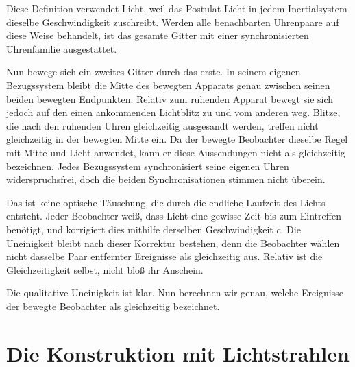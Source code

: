 Diese Definition verwendet Licht, weil das Postulat Licht in jedem Inertialsystem dieselbe Geschwindigkeit zuschreibt. Werden alle benachbarten Uhrenpaare auf diese Weise behandelt, ist das gesamte Gitter mit einer synchronisierten Uhrenfamilie ausgestattet.

Nun bewege sich ein zweites Gitter durch das erste. In seinem eigenen Bezugssystem bleibt die Mitte des bewegten Apparats genau zwischen seinen beiden bewegten Endpunkten. Relativ zum ruhenden Apparat bewegt sie sich jedoch auf den einen ankommenden Lichtblitz zu und vom anderen weg. Blitze, die nach den ruhenden Uhren gleichzeitig ausgesandt werden, treffen nicht gleichzeitig in der bewegten Mitte ein. Da der bewegte Beobachter dieselbe Regel mit Mitte und Licht anwendet, kann er diese Aussendungen nicht als gleichzeitig bezeichnen. Jedes Bezugssystem synchronisiert seine eigenen Uhren widerspruchsfrei, doch die beiden Synchronisationen stimmen nicht überein.

Das ist keine optische Täuschung, die durch die endliche Laufzeit des Lichts entsteht. Jeder Beobachter weiß, dass Licht eine gewisse Zeit bis zum Eintreffen benötigt, und korrigiert dies mithilfe derselben Geschwindigkeit \(c\). Die Uneinigkeit bleibt nach dieser Korrektur bestehen, denn die Beobachter wählen nicht dasselbe Paar entfernter Ereignisse als gleichzeitig aus. Relativ ist die Gleichzeitigkeit selbst, nicht bloß ihr Anschein.

\begin{classroomqa}
\end{classroomqa}

Die qualitative Uneinigkeit ist klar. Nun berechnen wir genau, welche Ereignisse der bewegte Beobachter als gleichzeitig bezeichnet.

\section{Die Konstruktion mit Lichtstrahlen}


